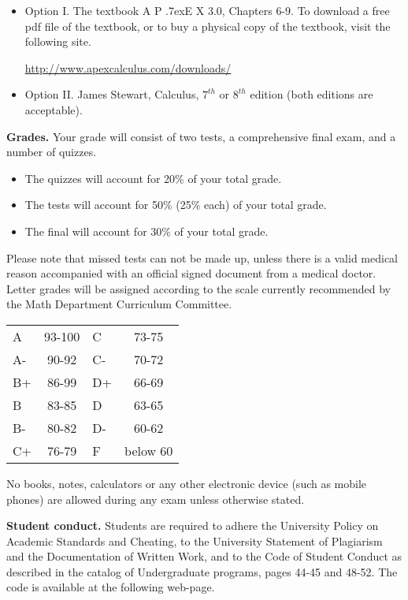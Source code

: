 \documentclass{article}
\newcommand{\apex}{A\kern -1pt \lower -2pt\hbox{P}\kern -4pt \lower .7ex\hbox{E}\kern -1pt X}
\begin{document}
\begin{itemize}
\item Option I. The textbook \apex{} 3.0, Chapters 6-9. To download a free pdf file of the textbook, or to buy a physical copy of the textbook, visit the following site.

\url{http://www.apexcalculus.com/downloads/} 
\item Option II. James Stewart, Calculus, $7^{th}$ or $8^{th}$ edition (both editions are acceptable).
\end{itemize}



\medskip
\noindent \textbf{Grades.} Your grade will consist of two tests, a comprehensive final exam, and a number of quizzes. 
\begin{itemize}
\item The quizzes will account for 20\% of your total grade.
\item The tests will account for 50\% (25\% each) of your total grade.
\item The final will account for 30\% of your total grade.
\end{itemize}
Please note that missed tests can not be made up, unless there is a valid medical reason accompanied with an official signed document from a medical doctor. Letter grades will be assigned according to the scale currently recommended by the Math Department Curriculum Committee. 

\begin{center}
\begin{tabular}{lc|lc}
A & 93-100 & C  & 73-75 \\
A-& 90-92  & C- & 70-72 \\
B+& 86-99  & D+ & 66-69 \\
B & 83-85  & D  & 63-65\\
B-& 80-82  & D- & 60-62\\
C+& 76-79  & F  & below 60\\
\end{tabular}

\end{center}

No books, notes, calculators or any other electronic device (such as mobile phones) are allowed during any exam unless otherwise stated.

\medskip
\noindent \textbf{Student conduct.} Students  are required to adhere the University Policy on Academic Standards and Cheating, to the University Statement of Plagiarism and the Documentation of Written Work, and to the Code of Student Conduct as described in the catalog of Undergraduate programs, pages 44-45 and 48-52. The code is available at the following web-page.
\end{document}
